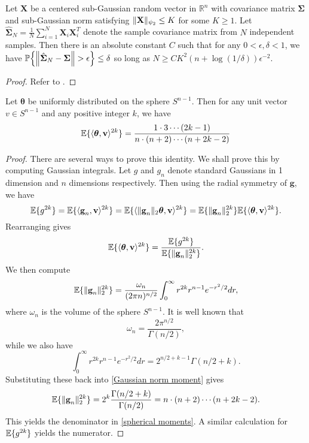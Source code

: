 \documentclass[final,12pt]{colt2018} %
\numberwithin{equation}{section}
\DeclarePairedDelimiter{\norm}{\lVert}{\rVert}
\DeclarePairedDelimiter{\braces}{\lbrace}{\rbrace}
\DeclarePairedDelimiter{\inprod}{\langle}{\rangle}
\renewcommand{\P}{\mathbb{P}}
\newcommand{\E}{\mathbb{E}}
\newcommand{\R}{\mathbb{R}}
\newcommand{\boldg}{\textbf{g}}
\newcommand{\boldv}{\textbf{v}}
\newcommand{\boldSigma}{\boldsymbol{\Sigma}}
\newcommand{\boldtheta}{\boldsymbol{\theta}}
\newcommand{\boldX}{\textbf{X}}
\begin{document}
\begin{lemma} \label{covariance estimation}
	Let $\boldX$ be a centered sub-Gaussian random vector in $\R^n$ with covariance matrix $\boldSigma$ and sub-Gaussian norm satisfying $\norm{\boldX}_{\psi_2} \leq K$ for some $K \geq 1$. Let $\hat{\boldSigma}_N=\frac{1}{N}\sum_{i=1}^N \boldX_i\boldX_i^T$ denote the sample covariance matrix from $N$ independent samples. Then there is an absolute constant $C$ such that for any $0 < \epsilon, \delta < 1$, we have $\P\braces*{\norm*{\hat{\boldSigma}_N-\boldSigma} > \epsilon} \leq \delta$ so long as $N \geq CK^2(n+\log(1/\delta))\epsilon^{-2}$.
\end{lemma}

\begin{proof}
	Refer to \cite{Vershynin2011b}.
\end{proof}

\begin{lemma}
	Let $\boldtheta$ be uniformly distributed on the sphere $S^{n-1}$. Then for any unit vector $v \in S^{n-1}$ and any positive integer $k$, we have
	\begin{align} \label{spherical moments}
	\E\braces{\inprod{\boldtheta,\boldv}^{2k}} = \frac{1\cdot 3\cdots(2k-1)}{n\cdot(n+2)\cdots(n+2k-2)}
	\end{align}
\end{lemma}

\begin{proof}
	There are several ways to prove this identity. We shall prove this by computing Gaussian integrals. Let $g$ and $g_n$ denote standard Gaussians in 1 dimension and $n$ dimensions respectively. Then using the radial symmetry of $\boldg$, we have
	\[
	\E\braces{g^{2k}} = \E\braces{\inprod{\boldg_n,\boldv}^{2k}} = \E\braces{\inprod{\norm{\boldg_n}_2\boldtheta,\boldv}^{2k}} = \E\braces{\norm{\boldg_n}_2^{2k}}\E\braces{\inprod{\boldtheta,\boldv}^{2k}}.
	\]
	Rearranging gives
	\[
	\E\braces{\inprod{\boldtheta,\boldv}^{2k}} = \frac{\E\braces{g^{2k}}}{\E\braces{\norm{\boldg_n}_2^{2k}}}.
	\]
	We then compute
	\begin{align} \label{Gaussian norm moment}
	\E\braces{\norm{\boldg_n}_2^{2k}} = \frac{\omega_n}{(2\pi n)^{n/2}}\int_0^\infty r^{2k}r^{n-1}e^{-r^2/2}dr,
	\end{align}
	where $\omega_n$ is the volume of the sphere $S^{n-1}$. It is well known that
	\[
	\omega_n = \frac{2\pi^{n/2}}{\Gamma(n/2)},
	\]
	while we also have
	\[
	\int_0^\infty r^{2k}r^{n-1}e^{-r^2/2}dr = 2^{n/2+k-1}\Gamma(n/2+k).
	\]
	Substituting these back into \eqref{Gaussian norm moment} gives
	\begin{equation} \label{eq: Gaussian moments}
	\E\braces{\norm{\boldg_n}_2^{2k}} = 2^k\frac{\Gamma(n/2+k)}{\Gamma(n/2)} = n\cdot(n+2)\cdots(n+2k-2).
	\end{equation}
	This yields the denominator in \eqref{spherical moments}. A similar calculation for $\E\braces{g^{2k}}$ yields the numerator. 
\end{proof}
\end{document}
